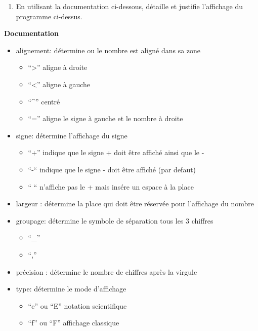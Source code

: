 \documentclass[
]{book}
\providecommand{\tightlist}{%
  \setlength{\itemsep}{0pt}\setlength{\parskip}{0pt}}
\def\tightlist{}
\begin{document}
\begin{enumerate}
\def\labelenumi{\arabic{enumi}.}
\setcounter{enumi}{1}
\tightlist
\item
  En utilisant la documentation ci-dessous, détaille et justifie l'affichage du programme ci-dessus.
\end{enumerate}

\textbf{Documentation}

\begin{itemize}
\tightlist
\item
  alignement: détermine ou le nombre est aligné dans sa zone

  \begin{itemize}
  \tightlist
  \item
    ``\textgreater{}'' aligne à droite
  \item
    ``\textless{}'' aligne à gauche
  \item
    ``\^{}'' centré
  \item
    ``='' aligne le signe à gauche et le nombre à droite
  \end{itemize}
\item
  signe: détermine l'affichage du signe

  \begin{itemize}
  \tightlist
  \item
    ``+'' indique que le signe + doit être affiché ainsi que le -
  \item
    ``-`` indique que le signe - doit être affiché (par defaut)
  \item
    `` `` n'affiche pas le + mais insére un espace à la place
  \end{itemize}
\item
  largeur : détermine la place qui doit être réservée pour l'affichage du nombre
\item
  groupage: détermine le symbole de séparation tous les 3 chiffres

  \begin{itemize}
  \tightlist
  \item
    ``\_''
  \item
    ``,''
  \end{itemize}
\item
  précision : détermine le nombre de chiffres après la virgule
\item
  type: détermine le mode d'affichage

  \begin{itemize}
  \tightlist
  \item
    ``e'' ou ``E'' notation scientifique
  \item
    ``f'' ou ``F'' affichage classique
  \end{itemize}
\end{itemize}
\end{document}
